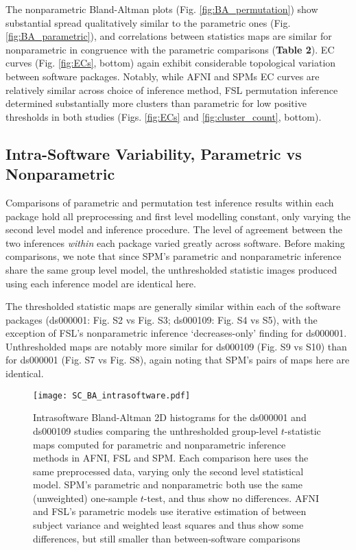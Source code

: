The nonparametric Bland-Altman plots (Fig. \ref{fig:BA_permutation}) show substantial spread qualitatively similar to the parametric ones (Fig. \ref{fig:BA_parametric}), and correlations between statistics maps are similar for nonparametric in congruence with the parametric comparisons (\textbf{Table 2}). EC curves (Fig. \ref{fig:ECs}, bottom) again exhibit considerable topological variation between software packages. Notably, while AFNI and SPMs EC curves are relatively similar across choice of inference method, FSL permutation inference determined substantially more clusters than parametric for low positive thresholds in both studies (Figs. \ref{fig:ECs} and \ref{fig:cluster_count}, bottom).

\subsection{Intra-Software Variability, Parametric vs Nonparametric}

Comparisons of parametric and permutation test inference results within each package hold all preprocessing and first level modelling constant, only varying the second level model and inference procedure. The level of agreement between the two inferences \textit{within} each package varied greatly across software. Before making comparisons, we note that since SPM's parametric and nonparametric inference share the same group level model, the unthresholded statistic images produced using each inference model are identical here.

The thresholded statistic maps are generally similar within each of the software packages (ds000001: Fig. S2 vs Fig. S3; ds000109: Fig. S4 vs S5), with the exception of FSL's nonparametric inference `decreases-only' finding for ds000001. Unthresholded maps are notably more similar for ds000109 (Fig. S9 vs S10) than for ds000001 (Fig. S7 vs Fig. S8), again noting that SPM's pairs of maps here are identical. 

\begin{figure}[htbp]
\centering
	\texttt{[image: SC\_BA\_intrasoftware.pdf]}	
\caption{Intrasoftware Bland-Altman 2D histograms for the ds000001 and ds000109 studies comparing the unthresholded group-level $t$-statistic maps computed for parametric and nonparametric inference methods in AFNI, FSL and SPM. Each comparison here uses the same preprocessed data, varying only the second level statistical model. SPM's parametric and nonparametric both use the same (unweighted) one-sample $t$-test, and thus show no differences. AFNI and FSL's parametric models use iterative estimation of between subject variance and weighted least squares and thus show some differences, but still smaller than between-software comparisons}
\label{fig:BA_intrasoftware}
\end{figure}


